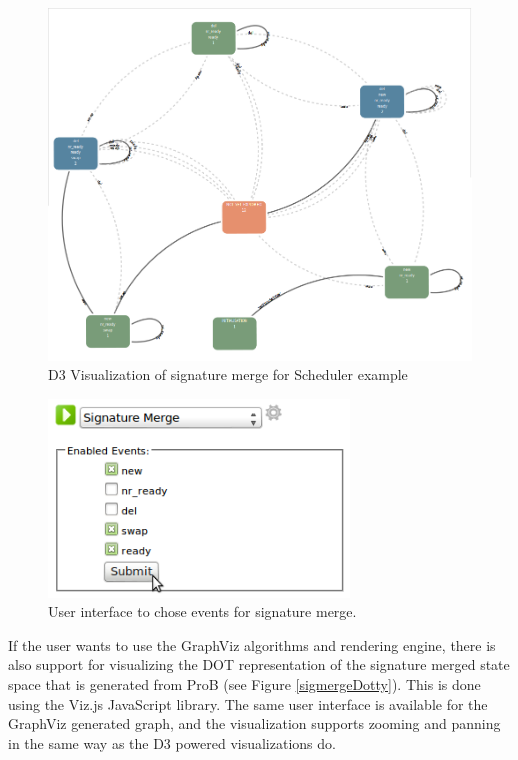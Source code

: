 \begin{center}
\begin{figure}[h!]
\centering
\includegraphics[width=14cm]{bilder/sigmerge.png}
\caption{D3 Visualization of signature merge for Scheduler example}
\label{sigmerge}
\end{figure}
\end{center}

\begin{center}
\begin{figure}[h!]
\centering
\includegraphics[width=8cm]{bilder/sigMergeUI.png}
\caption{User interface to chose events for signature merge.}
\label{sigMergeUI}
\end{figure}
\end{center}

If the user wants to use the GraphViz algorithms and rendering engine, there is also support for visualizing the DOT representation of the signature merged state space that is generated from ProB (see Figure \ref{sigmergeDotty}). This is done using the Viz.js JavaScript library. The same user interface is available for the GraphViz generated graph, and the visualization supports zooming and panning in the same way as the D3 powered visualizations do.

